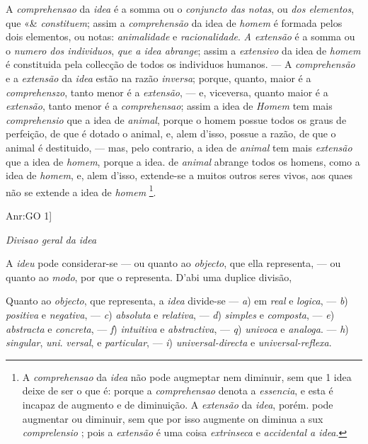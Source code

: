  
A \emph{comprehensao} da \emph{idea} é a somma ou o \emph{conjuncto das notas}, ou \emph{dos elementos}, que «\& \emph{constituem}; assim a \emph{comprehensão} da idea de \emph{homem} é formada pelos dois elementos, ou notas: \emph{animalidade} e \emph{racionalidade}. \emph{A extensão} é a somma ou o \emph{numero dos individuos}, \emph{que a idea abrange}; assim a \emph{extensivo} da idea de \emph{homem} é constituida pela collecção de todos os individuos humanos. --- A \emph{comprehensão} e a \emph{extensão} da \emph{idea} estão na razão \emph{inversa}; porque, quanto, maior é a \emph{comprehenszo}, tanto menor é a \emph{extensão}, --- e, viceversa, quanto maior é a \emph{extensão}, tanto menor é a \emph{comprehensao}; assim a idea de \emph{Homem} tem mais \emph{comprehensio} que a idea de \emph{animal}, porque o homem possue todos os graus de perfeição, de que é dotado o animal, e, alem d'isso, possue a razão, de que o animal é destituido, --- mas, pelo contrario, a idea de \emph{animal} tem mais \emph{extensão} que a idea de \emph{homem}, porque a idea. de \emph{animal} abrange todos os homens, como a idea de \emph{homem}, e, alem d'isso, extende-se a muitos outros seres vivos, aos quaes não se extende a idea de \emph{homem} \footnote{A \emph{comprehensao} da \emph{idea} não pode augmeptar nem diminuir, sem que 1 idea deixe de ser o que é: porque a \emph{comprehensao} denota a \emph{essencia}, e esta é incapaz de augmento e de diminuição. A \emph{extensão} da \emph{idea}, porém. pode augmentar ou diminuir, sem que por isso augmente on diminua a sux \emph{comprelensio} ; pois a \emph{extensão} é uma coisa \emph{extrinseca} e \emph{accidental a idea}.}.

Anr:GO 1]

\emph{Divisao geral da idea}


A \emph{ideu} pode considerar-se --- ou quanto ao \emph{objecto}, que ella representa, --- ou quanto ao \emph{modo}, por que o representa. D'abi uma duplice divisão,


Quanto ao \emph{objecto}, que representa, a \emph{idea} divide-se --- \emph{a}) em \emph{real} e \emph{logica}, --- \emph{b}) \emph{positiva} e \emph{negativa}, --- \emph{c}) \emph{absoluta} e \emph{relativa}, ---   \emph{d}) \emph{simples} e \emph{composta}, --- \emph{e}) \emph{abstracta} e \emph{concreta}, --- \emph{f}) \emph{intuitiva} e \emph{abstractiva}, --- \emph{q}) \emph{univoca} e \emph{analoga}. --- \emph{h}) \emph{singular}, \emph{uni}. \emph{versal}, e \emph{particular}, --- \emph{i}) \emph{universal-directa} e \emph{universal-reflexa}.

